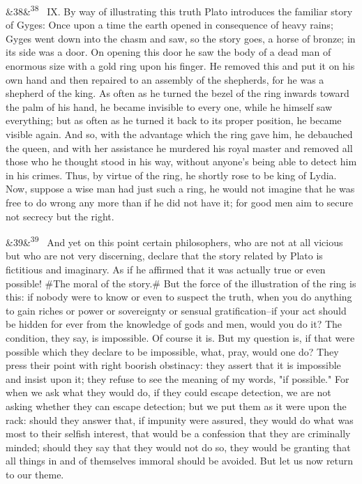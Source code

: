 \documentclass[12pt]{article}
\newcommand{\para}[1][]{\par\noindent\ifx&#1&\else\textsuperscript{\footnotesize #1}~\fi}
\begin{document}
\para[38] IX. By way of illustrating this truth Plato introduces the familiar story of Gyges: Once upon a time the earth opened in consequence of heavy rains; Gyges went down into the chasm and saw, so the story goes, a horse of bronze; in its side was a door. On opening this door he saw the body of a dead man of enormous size with a gold ring upon his finger. He removed this and put it on his own hand and then repaired to an assembly of the shepherds, for he was a shepherd of the king. As often as he turned the bezel of the ring inwards toward the palm of his hand, he became invisible to every one, while he himself saw everything; but as often as he turned it back to its proper position, he became visible again. And so, with the advantage which the ring gave him, he debauched the queen, and with her assistance he murdered his royal master and removed all those who he thought stood in his way, without anyone's being able to detect him in his crimes. Thus, by virtue of the ring, he shortly rose to be king of Lydia. Now, suppose a wise man had just such a ring, he would not imagine that he was free to do wrong any more than if he did not have it; for good men aim to secure not secrecy but the right.

\para[39] And yet on this point certain philosophers, who are not at all vicious but who are not very discerning, declare that the story related by Plato is fictitious and imaginary. As if he affirmed that it was actually true or even possible! \#The moral of the story.\# But the force of the illustration of the ring is this: if nobody were to know or even to suspect the truth, when you do anything to gain riches or power or sovereignty or sensual gratification--if your act should be hidden for ever from the knowledge of gods and men, would you do it? The condition, they say, is impossible. Of course it is. But my question is, if that were possible which they declare to be impossible, what, pray, would one do? They press their point with right boorish obstinacy: they assert that it is impossible and insist upon it; they refuse to see the meaning of my words, "if possible." For when we ask what they would do, if they could escape detection, we are not asking whether they can escape detection; but we put them as it were upon the rack: should they answer that, if impunity were assured, they would do what was most to their selfish interest, that would be a confession that they are criminally minded; should they say that they would not do so, they would be granting that all things in and of themselves immoral should be avoided. But let us now return to our theme.
\end{document}
